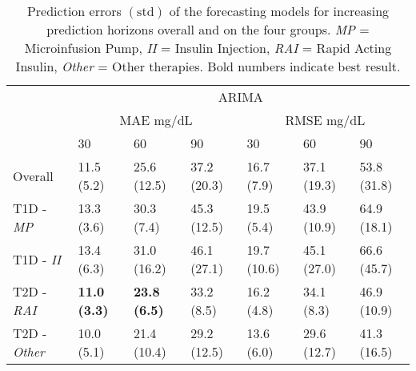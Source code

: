 \begin{table}[b!]
	\caption{Prediction errors $(\text{std})$ of the forecasting models for increasing prediction horizons overall and on the four groups. {\sl MP} = Microinfusion Pump, {\sl II} = Insulin Injection, {\sl RAI} = Rapid Acting Insulin, {\sl Other} = Other therapies. Bold numbers indicate best result.}
	\label{tab:errors}
		\begin{tabular}{lllllll}
			& \multicolumn{6}{c}{ARIMA}                                              \\ \cline{2-7}
			\multicolumn{1}{l|}{}                           & \multicolumn{3}{c|}{MAE mg/dL}          & \multicolumn{3}{c|}{RMSE mg/dL}         \\ \cline{2-7}
			\multicolumn{1}{l|}{}                           & 30 & 60 & \multicolumn{1}{l|}{90} & 30 & 60 & \multicolumn{1}{l|}{90}  \\ \hline
			\multicolumn{1}{l|}{Overall}                    & 11.5 (5.2) & 25.6 (12.5) & \multicolumn{1}{l|}{37.2 (20.3)} & 16.7 (7.9) & 37.1 (19.3) & \multicolumn{1}{l|}{53.8 (31.8)} \\
			\multicolumn{1}{l|}{T1D - {\sl MP}}   & 13.3 (3.6) & 30.3 (7.4) & \multicolumn{1}{l|}{45.3 (12.5)} & 19.5 (5.4) & 43.9 (10.9) & \multicolumn{1}{l|}{64.9 (18.1)}  \\
			\multicolumn{1}{l|}{T1D - {\sl II}}    & 13.4 (6.3) & 31.0 (16.2) & \multicolumn{1}{l|}{46.1 (27.1)} & 19.7 (10.6) & 45.1 (27.0) & \multicolumn{1}{l|}{66.6 (45.7)}  \\
			\multicolumn{1}{l|}{T2D - {\sl RAI}} & {\bf11.0 (3.3)} & {\bf 23.8 (6.5)} & \multicolumn{1}{l|}{33.2 (8.5)} & 16.2 (4.8) & 34.1 (8.3) & \multicolumn{1}{l|}{46.9 (10.9)}  \\
			\multicolumn{1}{l|}{T2D - {\sl Other}}      & 10.0 (5.1) & 21.4 (10.4) & \multicolumn{1}{l|}{29.2 (12.5)} & 13.6 (6.0) & 29.6 (12.7) & \multicolumn{1}{l|}{41.3 (16.5)}  \\ \hline
			

\end{tabular}
\end{table}
